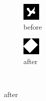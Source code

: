 \documentclass[12pt]{article}
\renewcommand{\subfiguresize}{.25\textwidth}
\begin{document}
\begin{figure}[H]\centering
    \begin{subfigure}[t]{\subfiguresize}
        \includegraphics[width=\textwidth]{img/image1.png}
        \caption{before}
    \end{subfigure}
    \hspace{2em}
    \begin{subfigure}[t]{\subfiguresize}
        \includegraphics[width=\textwidth]{img/image1-convexhull.png}
        \caption{after}
    \end{subfigure}\\[2em]


\end{figure}
\end{document}
